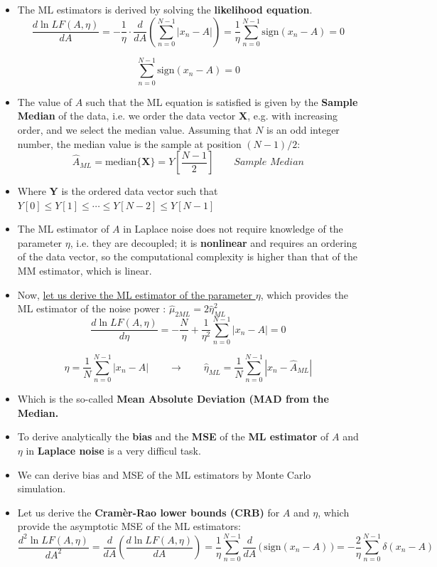 \begin{itemize}
\[
f_{\mathbf{X}}(\mathbf{x}; A, \eta) = \prod_{n=0}^{N-1} f_{X}(x_n; A,\eta)
= \left( \frac{1}{2\eta} \right)^N
\exp \left( -\frac{1}{\eta} \sum_{n=0}^{N-1} |x_n - A| \right)
\]

\[
\ln LF(A, \eta) = \ln f_{\mathbf{X}}(\mathbf{x};A,\eta)
= -N \ln(2) - N \ln(\eta) - \frac{1}{\eta} \sum_{n=0}^{N-1} |x_n - A|
\]


    \item The ML estimators is derived by solving the \textbf{likelihood equation}.
\[
\frac{d\ln LF(A, \eta)}{dA} =
- \frac{1}{\eta} \cdot \frac{d}{dA} \left( \sum_{n=0}^{N-1} |x_n - A| \right)
= \frac{1}{\eta} \sum_{n=0}^{N-1} \mathrm{sign}(x_n - A) = 0
\]

\[
\sum_{n=0}^{N-1} \mathrm{sign}(x_n - A) = 0 
\]
    \item The value of \(A\) such that the ML equation is satisfied is given by the \textbf{Sample Median} of the data, i.e. we order the data vector \textbf{X}, e.g. with increasing order, and we select the median value. Assuming that \(N\) is an odd integer number, the median value is the sample at position \((N-1)/2\):
\[
\hat{A}_{ML} = \mathrm{median}\{\mathbf{X}\}
= Y\left[\frac{N-1}{2}\right]
\qquad \textit{Sample Median}
\]
\item Where \textbf{Y} is the ordered data vector such that \(Y[0]\leq Y[1]\leq\cdots \leq Y[N-2]\leq Y[N-1]\)
\item The ML estimator of \(A\) in Laplace noise does not require knowledge of the parameter \(\eta\), i.e. they are decoupled; it is \textbf{nonlinear} and requires an ordering of the data vector, so the computational complexity is higher than that of the MM estimator, which is linear.
\item Now, \underline{let us derive the ML estimator of the parameter \(\eta\)}, which provides the ML estimator of the noise power : \(\hat{\mu}_{2ML}=2\hat{\eta}^2_{ML}\)
\[
\frac{d \ln LF(A, \eta)}{d\eta}
= -\frac{N}{\eta}
+ \frac{1}{\eta^2} \sum_{n=0}^{N-1} |x_n - A|
= 0
\]

\[
\eta = \frac{1}{N} \sum_{n=0}^{N-1} |x_n - A|
\qquad \rightarrow \qquad
\hat{\eta}_{ML} = \frac{1}{N} \sum_{n=0}^{N-1} |x_n - \hat{A}_{ML}|
\]
\item Which is the so-called \textbf{Mean Absolute Deviation (MAD from the Median.}
\item To derive analytically the \textbf{bias} and the \textbf{MSE} of the \textbf{ML estimator} of \(A\) and \(\eta\) in \textbf{Laplace noise} is a very difficul task.
\item We can derive bias and MSE of the ML estimators by Monte Carlo simulation.
\item Let us derive the \textbf{Cramèr-Rao lower bounds (CRB)} for \(A\) and \(\eta\), which provide the asymptotic MSE of the ML estimators:
\[
\frac{d^2 \ln LF(A, \eta)}{dA^2} =
\frac{d}{dA} \left( \frac{d \ln LF(A, \eta)}{dA} \right)
= \frac{1}{\eta} \sum_{n=0}^{N-1} \frac{d}{dA} \, \big(\, \mathrm{sign}(x_n - A)\, \big)
= -\frac{2}{\eta} \sum_{n=0}^{N-1} \delta(x_n - A)
\]


\end{itemize}
